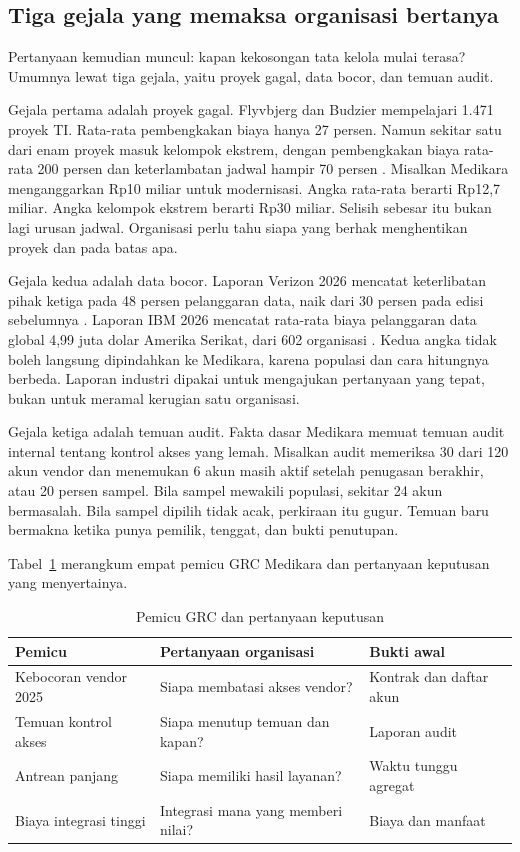 \subsection*{Tiga gejala yang memaksa organisasi bertanya}

Pertanyaan kemudian muncul: kapan kekosongan tata kelola mulai terasa? Umumnya lewat tiga
gejala, yaitu proyek gagal, data bocor, dan temuan audit.

Gejala pertama adalah proyek gagal. Flyvbjerg dan Budzier mempelajari 1.471 proyek TI.
Rata-rata pembengkakan biaya hanya 27 persen. Namun sekitar satu dari enam proyek masuk
kelompok ekstrem, dengan pembengkakan biaya rata-rata 200 persen dan keterlambatan jadwal
hampir 70 persen \cite{c01-flyvbjerg2011}. Misalkan Medikara menganggarkan Rp10 miliar untuk
modernisasi. Angka rata-rata berarti Rp12,7 miliar. Angka kelompok ekstrem berarti Rp30
miliar. Selisih sebesar itu bukan lagi urusan jadwal. Organisasi perlu tahu siapa yang
berhak menghentikan proyek dan pada batas apa.

Gejala kedua adalah data bocor. Laporan Verizon 2026 mencatat keterlibatan pihak ketiga
pada 48 persen pelanggaran data, naik dari 30 persen pada edisi sebelumnya
\cite{c01-verizon-dbir2026}. Laporan IBM 2026 mencatat rata-rata biaya pelanggaran data
global 4,99 juta dolar Amerika Serikat, dari 602 organisasi \cite{ibm-cdb2026}. Kedua angka
tidak boleh langsung dipindahkan ke Medikara, karena populasi dan cara hitungnya berbeda.
Laporan industri dipakai untuk mengajukan pertanyaan yang tepat, bukan untuk meramal
kerugian satu organisasi.

Gejala ketiga adalah temuan audit. Fakta dasar Medikara memuat temuan audit internal
tentang kontrol akses yang lemah. Misalkan audit memeriksa 30 dari 120 akun vendor dan
menemukan 6 akun masih aktif setelah penugasan berakhir, atau 20 persen sampel. Bila
sampel mewakili populasi, sekitar 24 akun bermasalah. Bila sampel dipilih tidak acak,
perkiraan itu gugur. Temuan baru bermakna ketika punya pemilik, tenggat, dan bukti
penutupan.

Tabel~\ref{tab:ch01-pemicu} merangkum empat pemicu GRC Medikara dan pertanyaan keputusan
yang menyertainya.
\begin{table}[!htb]
  \centering\small
  \caption{Pemicu GRC dan pertanyaan keputusan}\label{tab:ch01-pemicu}
  \begin{tabularx}{\textwidth}{|>{\raggedright\arraybackslash}p{}|>{\raggedright\arraybackslash}X|>{\raggedright\arraybackslash}X|}
    \hline
    \textbf{Pemicu} & \textbf{Pertanyaan organisasi} & \textbf{Bukti awal} \\ \hline
    Kebocoran vendor 2025 & Siapa membatasi akses vendor? & Kontrak dan daftar akun \\
    \hline
    Temuan kontrol akses & Siapa menutup temuan dan kapan? & Laporan audit \\ \hline
    Antrean panjang & Siapa memiliki hasil layanan? & Waktu tunggu agregat \\ \hline
    Biaya integrasi tinggi & Integrasi mana yang memberi nilai? & Biaya dan manfaat \\
    \hline
  \end{tabularx}
\end{table}

